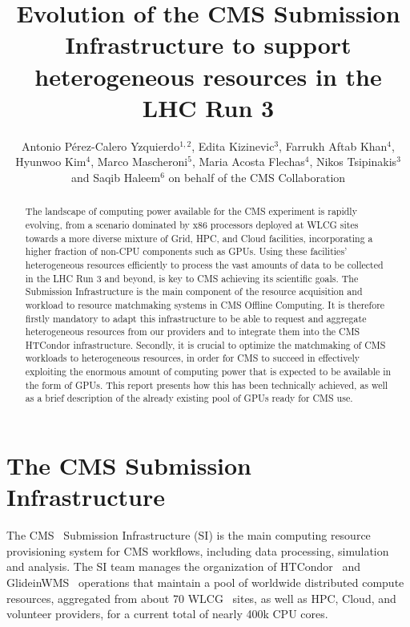 \documentclass[a4paper]{jpconf}
\begin{document}
\title{Evolution of the CMS Submission Infrastructure to support heterogeneous resources in the LHC Run 3}

\author{Antonio Pérez-Calero Yzquierdo$^{1,2}$, Edita Kizinevic$^3$, Farrukh Aftab Khan$^4$, Hyunwoo Kim$^4$, Marco Mascheroni$^5$, Maria Acosta Flechas$^4$, Nikos Tsipinakis$^3$ and Saqib Haleem$^6$ on behalf of the CMS Collaboration}
\address{$^1$ Port d'Informaci\'o Cientifica (PIC), Barcelona, Spain}
\address{$^2$ Centro de Investigaciones Energ\'eticas, Medioambientales y Tecnol\'ogicas (CIEMAT), Madrid, Spain}
\address{$^3$ European Organization for Nuclear Research (CERN), Geneva, Switzerland}
\address{$^4$ Fermi National Accelerator Laboratory, Batavia, IL, USA}
\address{$^5$ University of California San Diego, La Jolla, CA, USA}
\address{$^6$ National Centre for Physics, Islamabad, Pakistan}


\begin{abstract}
The landscape of computing power available for the CMS experiment is rapidly evolving, from a scenario dominated by x86 processors deployed at WLCG sites towards a more diverse mixture of Grid, HPC, and Cloud facilities, incorporating a higher fraction of non-CPU components such as GPUs. Using these facilities’ heterogeneous resources efficiently to process the vast amounts of data to be collected in the LHC Run 3 and beyond, is key to CMS achieving its scientific goals. The Submission Infrastructure is the main component of the resource acquisition and workload to resource matchmaking systems in CMS Offline Computing. It is therefore firstly mandatory to adapt this infrastructure to be able to request and aggregate heterogeneous resources from our providers and to integrate them into the CMS HTCondor infrastructure. Secondly, it is crucial to optimize the matchmaking of CMS workloads to heterogeneous resources, in order for CMS to succeed in effectively exploiting the enormous amount of computing power that is expected to be available in the form of GPUs. This report presents how this has been technically achieved, as well as a brief description of the already existing pool of GPUs ready for CMS use.

\end{abstract}

\section{The CMS Submission Infrastructure}\label{sec:intro}
The CMS~\cite{cms} Submission Infrastructure (SI) is the main computing resource provisioning system for CMS workflows, including data processing, simulation and analysis. The SI team manages the organization of HTCondor~\cite{htcondor} and GlideinWMS~\cite{gwms} operations that maintain a pool of worldwide distributed compute resources, aggregated from about 70 WLCG~\cite{wlcg} sites, as well as HPC, Cloud, and volunteer providers, for a current total of nearly 400k CPU cores. 
\end{document}
